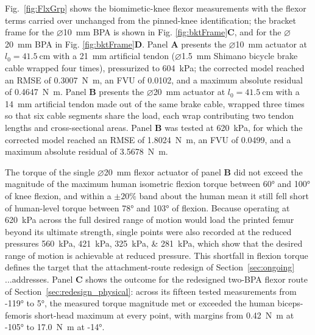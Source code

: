 Fig.~\ref{fig:FlxGrp} shows the biomimetic-knee flexor measurements with the flexor terms carried over unchanged from the pinned-knee identification; the bracket frame for the $\diameter$\qty{10}{\mm} BPA is shown in Fig. \ref{fig:bktFrame}\textbf{C}, and for the $\diameter$\qty{20}{\mm} BPA in Fig. \ref{fig:bktFrame}\textbf{D}. Panel \textbf{A} presents the $\diameter$\qty{10}{\mm} actuator at $l_{0}=\qty{41.5}{\cm}$ with a \qty{21}{\mm} artificial tendon ($\diameter$\qty{1.5}{\mm} Shimano bicycle brake cable wrapped four times), pressurized to \qty{604}{\kPa}; the corrected model reached an RMSE of \qty{0.3007}{\newton\meter}, an FVU of 0.0102, and a maximum absolute residual of \qty{0.4647}{\newton\meter}. Panel \textbf{B} presents the $\diameter$\qty{20}{\mm} actuator at $l_{0}=\qty{41.5}{\cm}$ with a \qty{14}{\mm} artificial tendon made out of the same brake cable, wrapped three times so that six cable segments share the load, each wrap contributing two tendon lengths and cross-sectional areas. Panel \textbf{B} was tested at \qty{620}{\kPa}, for which the corrected model reached an RMSE of \qty{1.8024}{\newton\meter}, an FVU of 0.0499, and a maximum absolute residual of \qty{3.5678}{\newton\meter}.

The torque of the single $\diameter$\qty{20}{\mm} flexor actuator of panel \textbf{B} did not exceed the magnitude of the maximum human isometric flexion torque between \ang{60} and \ang{100} of knee flexion, and within a $\pm 20\%$ band about the human mean it still fell short of human-level torque between \ang{78} and \ang{103} of flexion. Because operating at \qty{620}{\kPa} across the full desired range of motion would load the printed femur beyond its ultimate strength, single points were also recorded at the reduced pressures \qtylist{560;421;325;281}{\kPa}, which show that the desired range of motion is achievable at reduced pressure. This shortfall in flexion torque defines the target that the attachment-route redesign of Section~\ref{sec:ongoing} ...addresses. Panel \textbf{C} shows the outcome for the redesigned two-BPA flexor route of Section~\ref{sec:redesign_physical}: across its fifteen tested measurements from \ang{-119} to \ang{5}, the measured torque magnitude met or exceeded the human biceps-femoris short-head maximum at every point, with margins from \qty{0.42}{\newton\meter} at \ang{-105} to \qty{17.0}{\newton\meter} at \ang{-14}.

